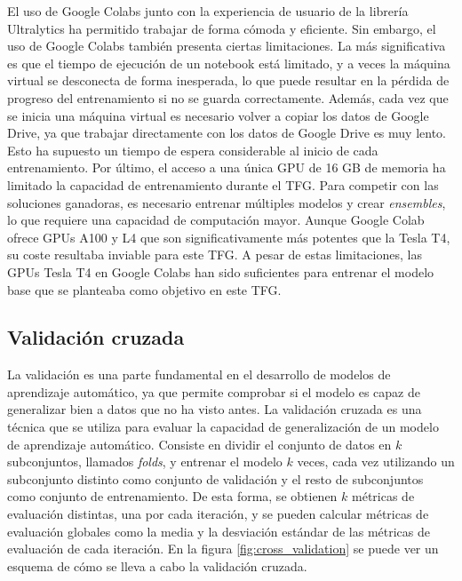 El uso de Google Colabs junto con la experiencia de usuario de la librería Ultralytics ha permitido trabajar de forma cómoda y eficiente. Sin embargo, el uso de Google Colabs también presenta ciertas limitaciones. La más significativa es que el tiempo de ejecución de un notebook está limitado, y a veces la máquina virtual se desconecta de forma inesperada, lo que puede resultar en la pérdida de progreso del entrenamiento si no se guarda correctamente. Además, cada vez que se inicia una máquina virtual es necesario volver a copiar los datos de Google Drive, ya que trabajar directamente con los datos de Google Drive es muy lento. Esto ha supuesto un tiempo de espera considerable al inicio de cada entrenamiento. Por último, el acceso a una única GPU de 16 GB de memoria ha limitado la capacidad de entrenamiento durante el TFG. Para competir con las soluciones ganadoras, es necesario entrenar múltiples modelos y crear \textit{ensembles}, lo que requiere una capacidad de computación mayor. Aunque Google Colab ofrece GPUs A100 y L4 que son significativamente más potentes que la Tesla T4, su coste resultaba inviable para este TFG. A pesar de estas limitaciones, las GPUs Tesla T4 en Google Colabs han sido suficientes para entrenar el modelo base que se planteaba como objetivo en este TFG.

\subsection{Validación cruzada}
La validación es una parte fundamental en el desarrollo de modelos de aprendizaje automático, ya que permite comprobar si el modelo es capaz de generalizar bien a datos que no ha visto antes. La validación cruzada es una técnica que se utiliza para evaluar la capacidad de generalización de un modelo de aprendizaje automático. Consiste en dividir el conjunto de datos en $k$ subconjuntos, llamados \textit{folds}, y entrenar el modelo $k$ veces, cada vez utilizando un subconjunto distinto como conjunto de validación y el resto de subconjuntos como conjunto de entrenamiento. De esta forma, se obtienen $k$ métricas de evaluación distintas, una por cada iteración, y se pueden calcular métricas de evaluación globales como la media y la desviación estándar de las métricas de evaluación de cada iteración. En la figura \ref{fig:cross_validation} se puede ver un esquema de cómo se lleva a cabo la validación cruzada.


